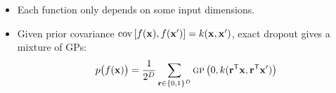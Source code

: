 {\begin{itemize}
	\item Each function only depends on some input dimensions.
	\item Given prior covariance $\operatorname{cov} \left[ f({\bf{x}}), f({\bf{x}}') \right] = k({\bf{x}}, {\bf{x}}')$,
	exact dropout gives a mixture of GPs:$$ p \big( f({\bf{x}}) \big)= \frac{1}{2^D} \sum_{{\bf{r}} \in \{0,1\}^D}  {\textsc{gp}} \left(0, k({\bf{r}}^\mathsf{T} {\bf{x}}, {\bf{r}}^\mathsf{T}{\bf{x}}') \right)$$
\end{itemize}
}


